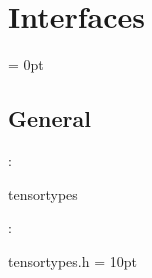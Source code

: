 
\section{Interfaces} 


\parskip = 0pt

\vspace{3mm} \subsection*{General}

: 

tensortypes
\vspace{2mm}

\vspace{5mm}

: 



tensortypes.h
\vspace{2mm}\parskip = 10pt 
